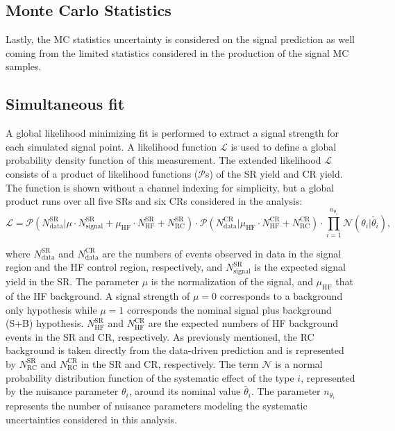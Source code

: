 \subsection*{Monte Carlo Statistics}
Lastly, the MC statistics uncertainty is considered on the signal prediction as well coming from the limited statistics considered in the production of the signal MC samples.

\subsection{Simultaneous fit}
A global likelihood minimizing fit is performed to extract a signal strength for each simulated signal point. A likelihood function $\mathcal{L}$ is used to define a global probability density function of this measurement. The extended likelihood $\mathcal{L}$ consists of a product of likelihood functions ($\mathcal{P}$s) of the SR yield and CR yield. The function is shown without a channel indexing for simplicity, but a global product runs over all five SRs and six CRs considered in the analysis:
\begin{equation}
\label{eqn:likelihood}
    \mathcal{L} = \mathcal{P}( N_{\mathrm{data}}^{\mathrm{SR}}| \mu \cdot N_{\mathrm{signal}}^{\mathrm{SR}} + 
    \mu_{\mathrm{HF}}  \cdot N_{\mathrm{HF}}^{\mathrm{SR}} + N_{\mathrm{RC}}^{\mathrm{SR}} ) \cdot 
    \mathcal{P}(N_{\mathrm{data}}^{\mathrm{CR}} | \mu_{\mathrm{HF}}\cdot N_{\mathrm{HF}}^{\mathrm{CR}} + N_{\mathrm{RC}}^{\mathrm{CR}}) \cdot                                                    \prod_{i=1}^{n_{\theta_i}}\mathcal{N}(\theta_i | \tilde{\theta_i}),
\end{equation}

where $N_{\mathrm{data}}^{\mathrm{SR}}$ and $N_{\mathrm{data}}^{\mathrm{CR}}$ are the numbers of events observed in data in the signal region and the HF control region, respectively, and $N_{\mathrm{signal}}^{\mathrm{SR}}$ is the expected signal yield in the SR. The parameter $\mu$ is the normalization of the signal, and $\mu_{\mathrm{HF}}$ that of the HF background. A signal strength of $\mu=0$ corresponds to a background only hypothesis while $\mu=1$ corresponds the nominal signal plus background (S+B) hypothesis. $N_{\mathrm{HF}}^{\mathrm{SR}}$ and $N_{\mathrm{HF}}^{\mathrm{CR}}$ are the expected numbers of HF background events in the SR and CR, respectively. As previously mentioned, the RC background is taken directly from the data-driven prediction and is represented by $N_{\mathrm{RC}}^{\mathrm{SR}}$ and $N_{\mathrm{RC}}^{\mathrm{CR}}$ in the SR and CR, respectively. The term $\mathcal{N}$ is a normal probability distribution function of the systematic effect of the type $i$, represented by the nuisance parameter $\theta_i$, around its nominal value $\tilde{\theta_i}$. The parameter $n_{\theta_i}$ represents the number of nuisance parameters modeling the systematic uncertainties considered in this analysis. 

